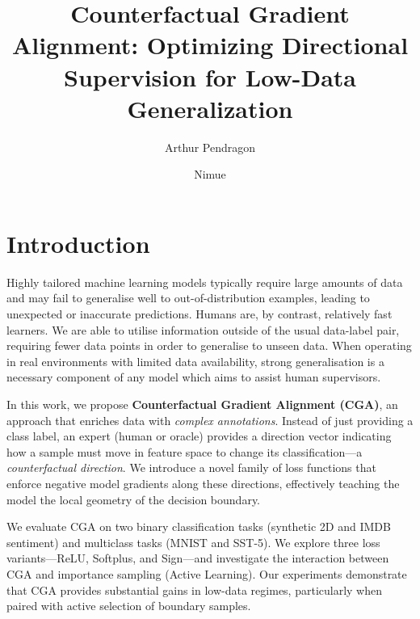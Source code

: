 \documentclass[sigconf,anonymous]{aamas}
\title[Counterfactual Gradient Alignment]{Counterfactual Gradient Alignment: Optimizing Directional Supervision for Low-Data Generalization}
\author{Arthur Pendragon}
\affiliation{
  \institution{Camelot Castle}
  \city{Camelot}
  \country{United Kingdom}}
\author{Nimue}
\affiliation{
  \institution{The Lady's Lake}
  \city{Avalon}
  \country{United Kingdom}}
\begin{document}

\pagestyle{fancy}
\fancyhead{}


\maketitle 




\section{Introduction}
Highly tailored machine learning models typically require large amounts of data and may fail to generalise well to out-of-distribution examples, leading to unexpected or inaccurate predictions. Humans are, by contrast, relatively fast learners. We are able to utilise information outside of the usual data-label pair, requiring fewer data points in order to generalise to unseen data. When operating in real environments with limited data availability, strong generalisation is a necessary component of any model which aims to assist human supervisors.

In this work, we propose \textbf{Counterfactual Gradient Alignment (CGA)}, an approach that enriches data with \emph{complex annotations}. Instead of just providing a class label, an expert (human or oracle) provides a direction vector indicating how a sample must move in feature space to change its classification---a \emph{counterfactual direction}. We introduce a novel family of loss functions that enforce negative model gradients along these directions, effectively teaching the model the local geometry of the decision boundary.

We evaluate CGA on two binary classification tasks (synthetic 2D and IMDB sentiment) and multiclass tasks (MNIST and SST-5). We explore three loss variants---ReLU, Softplus, and Sign---and investigate the interaction between CGA and importance sampling (Active Learning). Our experiments demonstrate that CGA provides substantial gains in low-data regimes, particularly when paired with active selection of boundary samples.
\end{document}

